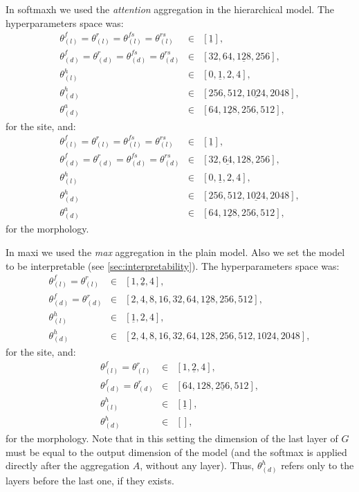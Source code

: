 In \ac{softmaxh} we used the \emph{attention} aggregation in the
hierarchical model. The hyperparameters space was:
\begin{align*}
  \theta_{(l)}^f=\theta_{(l)}^r=\theta_{(l)}^{fs}=\theta_{(l)}^{rs}&\in&[\underline{1}],\\
  \theta_{(d)}^f=\theta_{(d)}^r=\theta_{(d)}^{fs}=\theta_{(d)}^{rs}&\in&[32,64,\underline{128},256],\\
  \theta_{(l)}^h&\in&[0,\underline{1},2,4],\\
  \theta_{(d)}^h&\in&[256,512,\underline{1024},2048],\\
  \theta_{(d)}^a&\in&[64,\underline{128},256,512],
\end{align*}
for the site, and:
\begin{align*}
  \theta_{(l)}^f=\theta_{(l)}^r=\theta_{(l)}^{fs}=\theta_{(l)}^{rs}&\in&[\underline{1}],\\
  \theta_{(d)}^f=\theta_{(d)}^r=\theta_{(d)}^{fs}=\theta_{(d)}^{rs}&\in&[32,\underline{64},128,256],\\
  \theta_{(l)}^h&\in&[0,\underline{1},2,4],\\
  \theta_{(d)}^h&\in&[256,512,\underline{1024},2048],\\
  \theta_{(d)}^a&\in&[64,\underline{128},256,512],
\end{align*}
for the morphology.

In \ac{maxi} we used the \emph{max} aggregation in the plain
model. Also we set the model to be interpretable (see
\cref{sec:interpretability}). The hyperparameters space was:
\begin{align*}
  \theta_{(l)}^f=\theta_{(l)}^r&\in&[1,\underline{2},4],\\
  \theta_{(d)}^f=\theta_{(d)}^r&\in&[2,4,8,16,32,64,\underline{128},256,512],\\
  \theta_{(l)}^h&\in&[\underline{1},2,4],\\
  \theta_{(d)}^h&\in&[2,4,8,16,32,64,128,256,512,1024,2048],
\end{align*}
for the site, and:
\begin{align*}
  \theta_{(l)}^f=\theta_{(l)}^r&\in&[1,\underline{2},4],\\
  \theta_{(d)}^f=\theta_{(d)}^r&\in&[64,128,\underline{256},512],\\
  \theta_{(l)}^h&\in&[\underline{1}],\\
  \theta_{(d)}^h&\in&[],
\end{align*}
for the morphology. Note that in this setting the dimension of the
last layer of $G$ must be equal to the output dimension of the model
(and the softmax is applied directly after the aggregation $A$,
without any layer). Thus, $\theta_{(d)}^h$ refers only to the
layers before the last one, if they exists.




